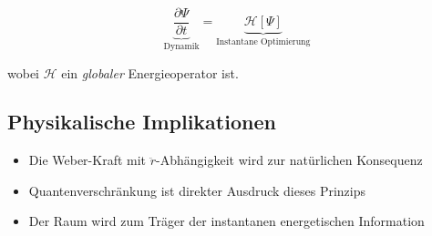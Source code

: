 \begin{equation}
    \underbrace{\frac{\partial \Psi}{\partial t}}_{\text{Dynamik}} = 
    \underbrace{\mathcal{H}[\Psi]}_{\text{Instantane Optimierung}}
\end{equation}

wobei $\mathcal{H}$ ein \emph{globaler} Energieoperator ist.

\subsection{Physikalische Implikationen}
\begin{itemize}
    \item Die Weber-Kraft mit $\ddot{r}$-Abhängigkeit wird zur natürlichen Konsequenz
    \item Quantenverschränkung ist direkter Ausdruck dieses Prinzips
    \item Der Raum wird zum Träger der instantanen energetischen Information
\end{itemize}
